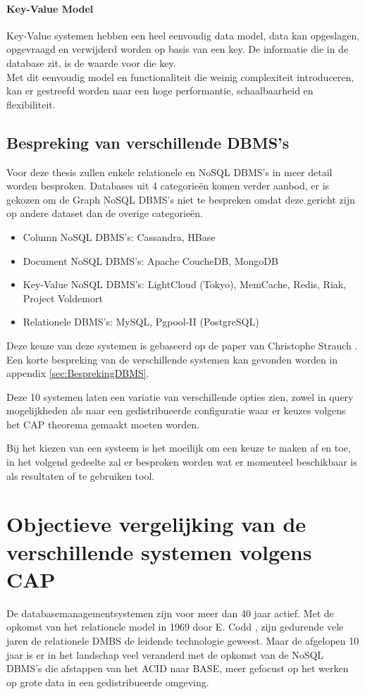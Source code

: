 \paragraph{Key-Value Model} Key-Value systemen hebben een heel eenvoudig data model, data kan opgeslagen, opgevraagd en verwijderd worden op basis van een key. De informatie die in de database zit, is de waarde voor die key. \\
Met dit eenvoudig model en functionaliteit die weinig complexiteit introduceren, kan er gestreefd worden naar een hoge performantie, schaalbaarheid en flexibiliteit. \cite{Strauch.NoSQL}

\subsection{Bespreking van verschillende DBMS's}
Voor deze thesis zullen enkele relationele en NoSQL DBMS's in meer detail worden besproken. Databases uit 4 categorieën komen verder aanbod, er is gekozen om de Graph NoSQL DBMS's niet te bespreken omdat deze gericht zijn op andere dataset dan de overige categorieën. 
\begin{itemize}
\item Column NoSQL DBMS's: Cassandra, HBase
\item Document NoSQL DBMS's: Apache CoucheDB, MongoDB
\item Key-Value NoSQL DBMS's: LightCloud (Tokyo), MemCache, Redis, Riak, Project Voldemort
\item Relationele DBMS's: MySQL, Pgpool-II (PostgreSQL)
\end{itemize}

Deze keuze van deze systemen is gebaseerd op de paper van Christophe Strauch \cite{Strauch.NoSQL}. Een korte bespreking van de verschillende systemen kan gevonden worden in appendix \ref{sec:BesprekingDBMS}.

Deze 10 systemen laten een variatie van verschillende opties zien, zowel in query mogelijkheden als naar een gedistribueerde configuratie waar er keuzes volgens het CAP theorema gemaakt moeten worden. 

Bij het kiezen van een systeem is het moeilijk om een keuze te maken af en toe, in het volgend gedeelte zal er besproken worden wat er momenteel beschikbaar is als resultaten of te gebruiken tool. 

\section{Objectieve vergelijking van de verschillende systemen volgens CAP}
De databasemanagementsystemen zijn voor meer dan 40 jaar actief. Met de opkomst van het relationele model in 1969 door E. Codd \cite{Codd:1970:RMD:362384.362685}, zijn gedurende vele jaren de relationele DMBS de leidende technologie geweest. Maar de afgelopen 10 jaar is er in het landschap veel veranderd met de opkomst van de NoSQL DBMS's die afstappen van het ACID naar BASE, meer gefocust op het werken op grote data in een gedistribueerde omgeving. 

